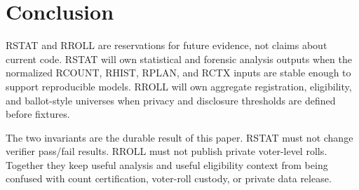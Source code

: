 \section{Conclusion}

RSTAT and RROLL are reservations for future evidence, not claims about current
code. RSTAT will own statistical and forensic analysis outputs when the
normalized RCOUNT, RHIST, RPLAN, and RCTX inputs are stable enough to support
reproducible models. RROLL will own aggregate registration, eligibility, and
ballot-style universes when privacy and disclosure thresholds are defined before
fixtures.

The two invariants are the durable result of this paper. RSTAT must not change
verifier pass/fail results. RROLL must not publish private voter-level rolls.
Together they keep useful analysis and useful eligibility context from being
confused with count certification, voter-roll custody, or private data release.
